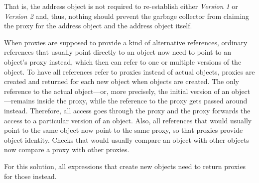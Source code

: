 That is, the address object is not required to re-establish either \emph{Version 1} or \emph{Version 2} and, thus, nothing should prevent the garbage collector from claiming the proxy for the address object and the address object itself.








When proxies are supposed to provide a kind of alternative references, ordinary references that usually point directly to an object now need to point to an object's proxy instead, which then can refer to one or multiple versions of the object.
To have all references refer to proxies instead of actual objects, proxies are created and returned for each new object when objects are created.
The only reference to the actual object---or, more precisely, the initial version of an object---remains inside the proxy, while the reference to the proxy gets passed around instead.
Therefore, all access goes through the proxy and the proxy forwards the access to a particular version of an object.
Also, all references that would usually point to the same object now point to the same proxy, so that proxies provide object identity.
Checks that would usually compare an object with other objects now compare a proxy with other proxies.

For this solution, all expressions that create new objects need to return proxies for those instead.





